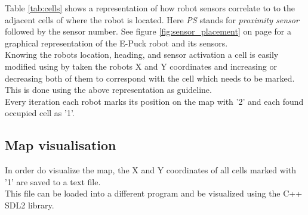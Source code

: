 Table \ref{tab:cells} shows a representation of how robot sensors correlate to to the adjacent cells of where the robot is located. Here \textit{PS} stands for \textit{proximity sensor} followed by the sensor number. See figure \ref{fig:sensor_placement} on page \pageref{fig:sensor_placement} for a graphical representation of the E-Puck robot and its sensors.  \\
Knowing the robots location, heading, and sensor activation a cell is easily modified using by taken the robots X and Y coordinates and increasing or decreasing both of them to correspond with the cell which needs to be marked. This is done using the above representation as guideline. \\
Every iteration each robot marks its position on the map with '2' and each found occupied cell as '1'.\\

\subsection{Map visualisation}
In order do visualize the map, the X and Y coordinates of all cells marked with '1' are saved to a text file.\\
This file can be loaded into a different program and be visualized using the C++ SDL2 library.
